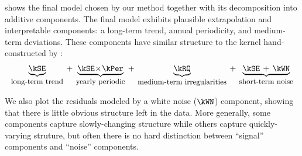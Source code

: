  shows the final model chosen by our method together with its decomposition into additive components.
The final model exhibits plausible extrapolation and interpretable components: a long-term trend, annual periodicity, and medium-term deviations.
These components have similar structure to the kernel hand-constructed by \citet[chapter 5]{rasmussen38gaussian}:
%
\begin{align}
\underwrite{\kSE}{\small long-term trend}
\kernplus
\underwrite{\kSE \kerntimes \kPer}{\small yearly periodic}
\kernplus
\underwrite{\kRQ}{\small medium-term irregularities}
\kernplus 
\underwrite{\kSE \kernplus \kWN}{\small short-term noise}
\end{align}

We also plot the residuals modeled by a white noise ($\kWN$) component, showing that there is little obvious structure left in the data.
More generally, some components capture slowly-changing structure while others capture quickly-varying struture, but often there is no hard distinction between ``signal'' components and ``noise'' components.

